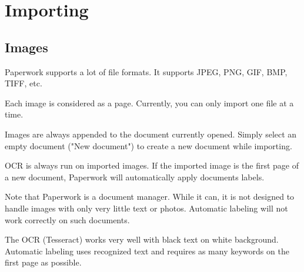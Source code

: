 \documentclass[10pt,a4paper]{article}
\begin{document}
\section{Importing}




\subsection{Images}

Paperwork supports a lot of file formats. It supports JPEG, PNG, GIF,
BMP, TIFF, etc.

Each image is considered as a page. Currently, you can only import
one file at a time.

Images are always appended to the document currently opened. Simply
select an empty document ("New document") to create a new document while
importing.

OCR is always run on imported images. If the imported image is the
first page of a new document, Paperwork will automatically apply documents
labels.

Note that Paperwork is a document manager. While it can, it is not
designed to handle images with only very little text or photos. Automatic
labeling will not work correctly on such documents.

The OCR (Tesseract) works very well with black text on white background.
Automatic labeling uses recognized text and requires as many keywords
on the first page as possible.
\end{document}
